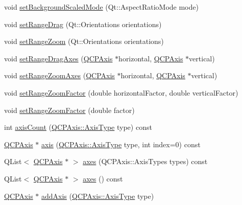 \begin{DoxyCompactItemize}
\item 
void \hyperlink{class_q_c_p_axis_rect_a5ef77ea829c9de7ba248e473f48f7305}{set\-Background\-Scaled\-Mode} (Qt\-::\-Aspect\-Ratio\-Mode mode)
\item 
void \hyperlink{class_q_c_p_axis_rect_ae6aef2f7211ba6097c925dcd26008418}{set\-Range\-Drag} (Qt\-::\-Orientations orientations)
\item 
void \hyperlink{class_q_c_p_axis_rect_a7960a9d222f1c31d558b064b60f86a31}{set\-Range\-Zoom} (Qt\-::\-Orientations orientations)
\item 
void \hyperlink{class_q_c_p_axis_rect_a648cce336bd99daac4a5ca3e5743775d}{set\-Range\-Drag\-Axes} (\hyperlink{class_q_c_p_axis}{Q\-C\-P\-Axis} $\ast$horizontal, \hyperlink{class_q_c_p_axis}{Q\-C\-P\-Axis} $\ast$vertical)
\item 
void \hyperlink{class_q_c_p_axis_rect_a9442cca2aa358405f39a64d51eca13d2}{set\-Range\-Zoom\-Axes} (\hyperlink{class_q_c_p_axis}{Q\-C\-P\-Axis} $\ast$horizontal, \hyperlink{class_q_c_p_axis}{Q\-C\-P\-Axis} $\ast$vertical)
\item 
void \hyperlink{class_q_c_p_axis_rect_a895d7ac745ea614e04056244b3c138ac}{set\-Range\-Zoom\-Factor} (double horizontal\-Factor, double vertical\-Factor)
\item 
void \hyperlink{class_q_c_p_axis_rect_ae83d187b03fc6fa4f00765ad50cd3fc3}{set\-Range\-Zoom\-Factor} (double factor)
\item 
int \hyperlink{class_q_c_p_axis_rect_a16e3e4646e52e4b5d5b865076c29ae58}{axis\-Count} (\hyperlink{class_q_c_p_axis_ae2bcc1728b382f10f064612b368bc18a}{Q\-C\-P\-Axis\-::\-Axis\-Type} type) const 
\item 
\hyperlink{class_q_c_p_axis}{Q\-C\-P\-Axis} $\ast$ \hyperlink{class_q_c_p_axis_rect_a560de44e47a4af0f86c59102a094b1e4}{axis} (\hyperlink{class_q_c_p_axis_ae2bcc1728b382f10f064612b368bc18a}{Q\-C\-P\-Axis\-::\-Axis\-Type} type, int index=0) const 
\item 
Q\-List$<$ \hyperlink{class_q_c_p_axis}{Q\-C\-P\-Axis} $\ast$ $>$ \hyperlink{class_q_c_p_axis_rect_a66654d51ca611ef036ded36250cd2518}{axes} (Q\-C\-P\-Axis\-::\-Axis\-Types types) const 
\item 
Q\-List$<$ \hyperlink{class_q_c_p_axis}{Q\-C\-P\-Axis} $\ast$ $>$ \hyperlink{class_q_c_p_axis_rect_a18dcdc0dd6c7520bc9f3d15a7a3feec2}{axes} () const 
\item 
\hyperlink{class_q_c_p_axis}{Q\-C\-P\-Axis} $\ast$ \hyperlink{class_q_c_p_axis_rect_acbc382cc7715d23310d65d91f50a4bde}{add\-Axis} (\hyperlink{class_q_c_p_axis_ae2bcc1728b382f10f064612b368bc18a}{Q\-C\-P\-Axis\-::\-Axis\-Type} type)

\end{DoxyCompactItemize}
